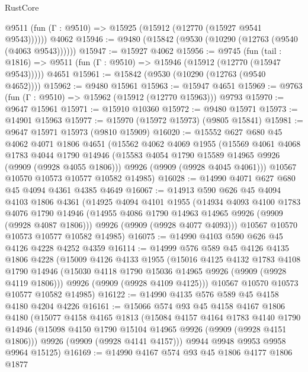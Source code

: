 \begin{lexlean}{RustCore}
\begin{coremodule}
      @9511 (fun (Γ : @9510) => @15925 (@15912 (@12770 (@15927 @9541 @9543))))))
    @4062
@15946 := @9480 (@15842 (@9530 (@10290 (@12763 (@9540 (@4063 @9543))))))
@15947 := @15927 @4062
@15956 := @9745
    (fun (tail : @1816) => @9511 (fun (Γ : @9510) => @15946 (@15912 (@12770 (@15947 @9543)))))
    @4651
@15961 := @15842 (@9530 (@10290 (@12763 (@9540 @4652))))
@15962 := @9480 @15961
@15963 := @15947 @4651
@15969 := @9763 (fun (Γ : @9510) => @15962 (@15912 (@12770 @15963))) @9793
@15970 := @9647 @15961
@15971 := @15910 @10360
@15972 := @9480 @15971
@15973 := @14901 @15963
@15977 := @15970 (@15972 @15973) (@9805 @15841)
@15981 := @9647 @15971 @15973 (@9810 @15909)
@16020 := @15552
    @627
    @680
    @45
    @4062
    @4071
    @1806
    @4651
    (@15562
      @4062
      @4069
      @1955
      (@15569
        @4061
        @4068
        @1783
        @4044
        @1790
        @14946
        (@15583 @4054 @1790 @15589 @14965 @9926 (@9909 (@9928 @4055 @1806)))
        @9926
        (@9909 (@9928 @4045 @4061)))
      @10567
      @10570
      @10573
      @10577
      @10582
      @14985)
@16028 := @14990 @4071 @627 @680 @45 @4094 @4361 @4385 @4649
@16067 := @14913
    @590
    @626
    @45
    @4094
    @4103
    @1806
    @4361
    (@14925
      @4094
      @4101
      @1955
      (@14934
        @4093
        @4100
        @1783
        @4076
        @1790
        @14946
        (@14955 @4086 @1790 @14963 @14965 @9926 (@9909 (@9928 @4087 @1806)))
        @9926
        (@9909 (@9928 @4077 @4093)))
      @10567
      @10570
      @10573
      @10577
      @10582
      @14985)
@16075 := @14990 @4103 @590 @626 @45 @4126 @4228 @4252 @4359
@16114 := @14999
    @576
    @589
    @45
    @4126
    @4135
    @1806
    @4228
    (@15009
      @4126
      @4133
      @1955
      (@15016
        @4125
        @4132
        @1783
        @4108
        @1790
        @14946
        (@15030 @4118 @1790 @15036 @14965 @9926 (@9909 (@9928 @4119 @1806)))
        @9926
        (@9909 (@9928 @4109 @4125)))
      @10567
      @10570
      @10573
      @10577
      @10582
      @14985)
@16122 := @14990 @4135 @576 @589 @45 @4158 @4180 @4204 @4226
@16161 := @15066
    @574
    @93
    @45
    @4158
    @4167
    @1806
    @4180
    (@15077
      @4158
      @4165
      @1813
      (@15084
        @4157
        @4164
        @1783
        @4140
        @1790
        @14946
        (@15098 @4150 @1790 @15104 @14965 @9926 (@9909 (@9928 @4151 @1806)))
        @9926
        (@9909 (@9928 @4141 @4157)))
      @9944
      @9948
      @9953
      @9958
      @9964
      @15125)
@16169 := @14990 @4167 @574 @93 @45 @1806 @4177 @1806 @1877

\end{coremodule}
\end{lexlean}
